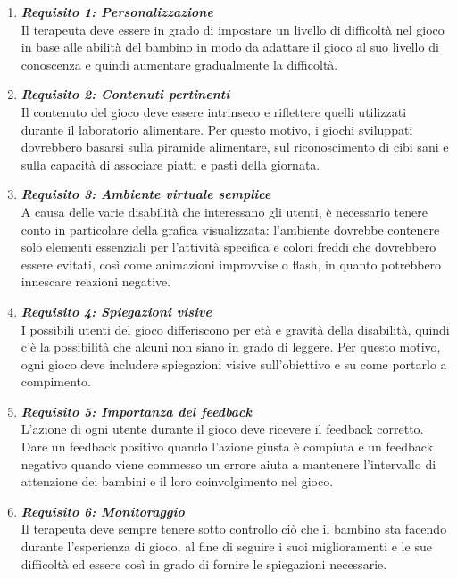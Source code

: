 \begin{enumerate}
\item \textit{\textbf{Requisito 1: Personalizzazione}}\\
Il terapeuta deve essere in grado di impostare un livello di difficoltà nel gioco in base alle abilità del bambino in modo da adattare il gioco al suo livello di conoscenza e quindi aumentare gradualmente la difficoltà.
\item \textit{\textbf{Requisito 2: Contenuti pertinenti}}\\
Il contenuto del gioco deve essere intrinseco e riflettere quelli utilizzati durante il laboratorio alimentare. Per questo motivo, i giochi sviluppati dovrebbero basarsi sulla piramide alimentare, sul riconoscimento di cibi sani e sulla capacità di associare piatti e pasti della giornata.
\clearpage
\item \textit{\textbf{Requisito 3: Ambiente virtuale semplice}}\\
A causa delle varie disabilità che interessano gli utenti, è necessario tenere conto in particolare della grafica visualizzata: l'ambiente dovrebbe contenere solo elementi essenziali per l'attività specifica e colori freddi che dovrebbero essere evitati, così come animazioni improvvise o flash, in quanto potrebbero innescare reazioni negative.
\item \textit{\textbf{Requisito 4: Spiegazioni visive}}\\
I possibili utenti del gioco differiscono per età e gravità della disabilità, quindi c'è la possibilità che alcuni non siano in grado di leggere. Per questo motivo, ogni gioco deve includere spiegazioni visive sull'obiettivo e su come portarlo a compimento.
\item \textit{\textbf{Requisito 5: Importanza del feedback}}\\
L'azione di ogni utente durante il gioco deve ricevere il feedback corretto. Dare un feedback positivo quando l'azione giusta è compiuta e un feedback negativo quando viene commesso un errore aiuta a mantenere l'intervallo di attenzione dei bambini e il loro coinvolgimento nel gioco.
\item \textit{\textbf{Requisito 6: Monitoraggio}}\\
Il terapeuta deve sempre tenere sotto controllo ciò che il bambino sta facendo durante l'esperienza di gioco, al fine di seguire i suoi miglioramenti e le sue difficoltà ed essere così in grado di fornire le spiegazioni necessarie.
\end{enumerate}


